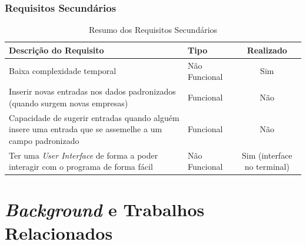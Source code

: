 \documentclass[a4paper,12pt]{article}
\begin{document}
\subsubsection{Requisitos Secundários}
\begin{table}[h!]
    \centering
    \begin{tabularx}{\textwidth}{|X|l|c|}
        \hline
        \textbf{Descrição do Requisito} & \textbf{Tipo} & \textbf{Realizado} \\ \hline
        Baixa complexidade temporal & Não Funcional & Sim \\ \hline
        Inserir novas entradas nos dados padronizados (quando surgem novas empresas) & Funcional & Não \\ \hline
        Capacidade de sugerir entradas quando alguém insere uma entrada que se assemelhe a um campo padronizado & Funcional & Não \\ \hline
        Ter uma \textit{User Interface} de forma a poder interagir com o programa de forma fácil & Não Funcional & Sim (interface no terminal)\\ \hline
    \end{tabularx}
    \caption{Resumo dos Requisitos Secundários}
    \label{tab:requirements-secondary}
\end{table}

\newpage
\section{\textit{Background} e Trabalhos Relacionados}
\end{document}
